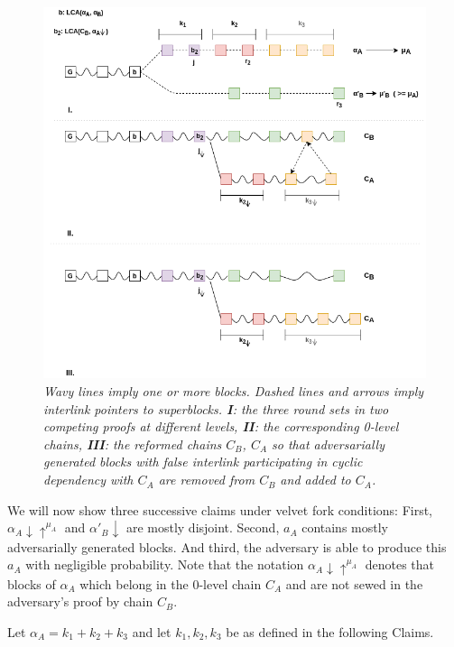 \documentclass[9pt,a4paper]{article}
\begin{document}
\begin{figure}[h!]
	\begin{center}
		\includegraphics[scale=0.5]{figures/proof_velvet.png}
	\end{center}
	\caption{\textit{ Wavy lines imply one or more blocks. Dashed lines and arrows imply interlink pointers to superblocks. \textbf{I}: the three round sets in two competing proofs at different levels, \textbf{II}: the corresponding 0-level chains, \textbf{III}: the reformed chains $C_B$, $C_A$ so that adversarially generated blocks with false interlink participating in cyclic dependency with $C_A$ are removed from $C_B$ and added to $C_A$.}}
	\label{fig:proof_velvet}
\end{figure}

We will now show three successive claims under velvet fork conditions: First, $\alpha_A \downarrow \uparrow^{\mu_A}$ and $\alpha'_B \downarrow$ are mostly disjoint. Second, $a_A$ contains mostly adversarially generated blocks. And third, the adversary is able to produce this $a_A$ with negligible probability. Note that the notation $\alpha_A \downarrow \uparrow^{\mu_A}$ denotes that blocks of $\alpha_A$ which belong in the 0-level chain $C_A$ and are not sewed in the adversary's proof by chain $C_B$.

Let $\alpha_A = k_1 + k_2 + k_3$ and let $k_1, k_2, k_3$ be as defined in the following Claims.\\
\end{document}
